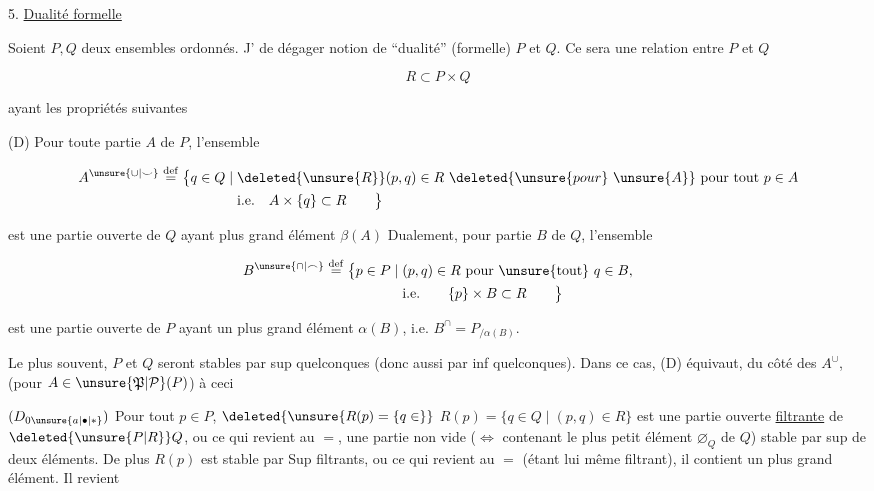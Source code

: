 5. \uline{Dualité formelle}

Soient $P,Q$ deux ensembles ordonnés.  J' de dégager   notion de ``dualité'' (formelle)   $P$ et $Q$. Ce sera une relation entre $P$ et $Q$

\[
R\subset P\times Q
\tag*{(5.1.)}
\]

ayant les propriétés suivantes

(D) Pour toute partie $A$ de $P$, l'ensemble

\[
\begin{aligned}
 A^{\unsure{\cup|\smile}}\overset{\mathrm{def}}{=}
 \big\{q\in Q\mid{}&\deleted{\unsure{R}}(p,q)\in R\ \deleted{\unsure{pour}\ \unsure{A}}\ \text{pour tout }p\in A\\
 &\text{i.e.}\quad A\times\{q\}\subset R\qquad\big\}
\end{aligned}
\]

est une partie ouverte de $Q$ ayant  plus grand élément $\beta(A)$  Dualement, pour  partie $B$ de $Q$, l'ensemble

\[
\begin{aligned}
 B^{\unsure{\cap|\frown}}\overset{\mathrm{def}}{=}
 \big\{p\in P\mid{}&(p,q)\in R\ \text{pour }\unsure{\text{tout}}\ q\in B,\\
 &\text{i.e.}\qquad \{p\}\times B\subset R\qquad\big\}
\end{aligned}
\]

est une partie ouverte de $P$ ayant un plus grand élément $\alpha(B)$, i.e. $B^\cap=P_{/\alpha(B)}$.

Le plus souvent, $P$ et $Q$ seront stables par sup quelconques (donc aussi par inf quelconques). Dans ce cas, (D) équivaut, du côté des $A^\cup$, (pour $A\in\unsure{\mathfrak P|\mathcal P}(P)$) à ceci

$(D_{0\unsure{a|\bullet|*}})$ Pour tout $p\in P$, $\deleted{\unsure{R(p)=\{q\in}}$ $R(p)=\{q\in Q\mid(p,q)\in R\}$ est une partie ouverte \uline{filtrante} de $\deleted{\unsure{P|R}}Q$, ou ce qui revient au $=$, une partie non vide ($\Longleftrightarrow$ contenant le plus petit élément $\varnothing_Q$ de $Q$) stable par sup de deux éléments. De plus $R(p)$ est stable par  Sup filtrants, ou ce qui revient au $=$ (étant lui même filtrant), il contient un plus grand élément. Il revient

